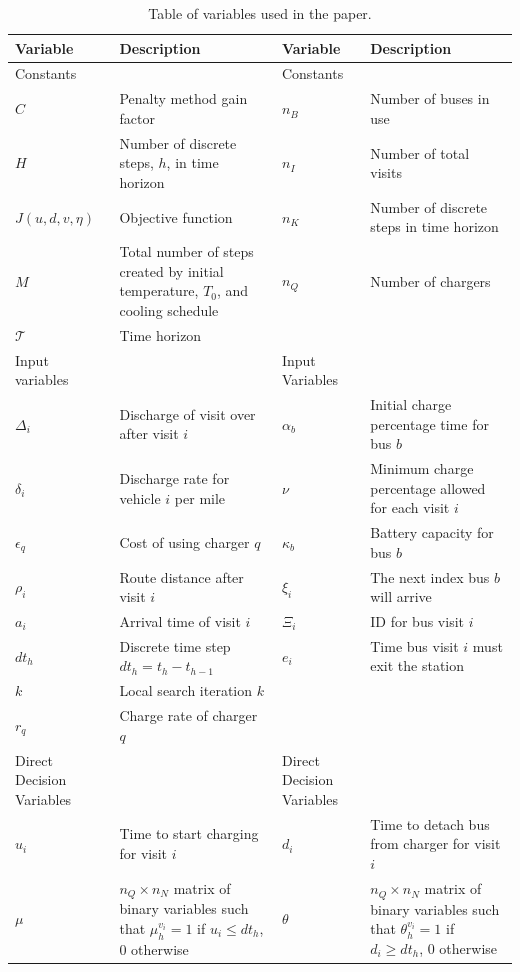 \documentclass[11pt,a4paper,final]{article}
\newcommand{\T}{\mathcal{T}}                %
\newcommand{\Tau}{T}                        %
\begin{document}
\begin{table}[htbp]
\caption{\label{tab:variables}Table of variables used in the paper.}
\centering
\begin{tabularx}{\textwidth}{L{0.3} L{1.2} L{0.3} L{1.2}}
\textbf{Variable} & \textbf{Description} & \textbf{Variable} & \textbf{Description}\\[0pt]
\hline
Constants &  & Constants & \\[0pt]
\(C\) & Penalty method gain factor & \(n_B\) & Number of buses in use\\[0pt]
\(H\) & Number of discrete steps, \(h\), in time horizon & \(n_I\) & Number of total visits\\[0pt]
\(J(u,d,v,\eta)\) & Objective function & \(n_K\) & Number of discrete steps in time horizon\\[0pt]
\(M\) & Total number of steps created by initial temperature, \(\Tau_0\), and cooling schedule & \(n_Q\) & Number of chargers\\[0pt]
\(\T\) & Time horizon &  & \\[0pt]
\hline
Input variables &  & Input Variables & \\[0pt]
\(\Delta_i\) & Discharge of visit over after visit \(i\) & \(\alpha_b\) & Initial charge percentage time for bus \(b\)\\[0pt]
\(\delta_i\) & Discharge rate for vehicle \(i\) per mile & \(\nu\) & Minimum charge percentage allowed for each visit \(i\)\\[0pt]
\(\epsilon_q\) & Cost of using charger \(q\) & \(\kappa_b\) & Battery capacity for bus \(b\)\\[0pt]
\(\rho_i\) & Route distance after visit \(i\) & \(\xi_i\) & The next index bus \(b\) will arrive\\[0pt]
\(a_i\) & Arrival time of visit \(i\) & \(\Xi_i\) & ID for bus visit \(i\)\\[0pt]
\(dt_h\) & Discrete time step \(dt_h = t_h - t_{h-1}\) & \(e_i\) & Time bus visit \(i\) must exit the station\\[0pt]
\(k\) & Local search iteration \(k\) &  & \\[0pt]
\(r_q\) & Charge rate of charger \(q\) &  & \\[0pt]
\hline
Direct Decision Variables &  & Direct Decision Variables & \\[0pt]
\(u_i\) & Time to start charging for visit \(i\) & \(d_i\) & Time to detach bus from charger for visit \(i\)\\[0pt]
\(\mu\) & \(n_Q \times n_N\) matrix of binary variables such that \(\mu_h^{v_i} = 1\) if \(u_i \le dt_h\), 0 otherwise & \(\theta\) & \(n_Q \times n_N\) matrix of binary variables such that \(\theta_h^{v_i} = 1\) if \(d_i \ge dt_h\), 0 otherwise\\[0pt]

\end{tabularx}
\end{table}
\end{document}
